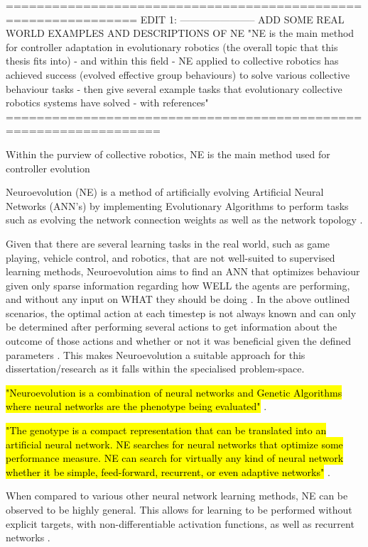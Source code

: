 ===============================================================
EDIT 1:
-----------------------
ADD SOME REAL WORLD EXAMPLES AND DESCRIPTIONS OF NE 
"NE is the main method for controller adaptation in evolutionary robotics (the overall topic that this thesis fits into) - and within this field - NE applied to collective robotics has achieved success (evolved effective group behaviours) to solve various collective behaviour tasks - then give several example tasks that evolutionary collective robotics systems have solved - with references"
==================================================================

Within the purview of collective robotics, NE is the main method used for controller evolution

Neuroevolution (NE) is a method of artificially evolving Artificial Neural Networks (ANN's) by implementing Evolutionary Algorithms to perform tasks such as evolving the network connection weights as well as the network topology \cite{Stanley2004, XinYao1999}.

Given that there are several learning tasks in the real world, such as game playing, vehicle control, and robotics, that are not well-suited to supervised learning methods, Neuroevolution aims to find an ANN that optimizes behaviour given only sparse information regarding how WELL the agents are performing, and without any input on WHAT they should be doing \cite{Miikkulainen2010}. 
In the above outlined scenarios, the optimal action at each timestep is not always known and can only be determined after performing several actions to get information about the outcome of those actions and whether or not it was beneficial given the defined parameters \cite{Miikkulainen2010}.
This makes Neuroevolution a suitable approach for this dissertation/research as it falls within the specialised problem-space.

\hl{"Neuroevolution is a combination of neural networks and Genetic Algorithms where neural networks are the phenotype being evaluated"} \cite{Stanley2004}.

\hl{"The genotype is a compact representation that can be translated into an artificial neural network. NE searches for neural networks that optimize some performance measure. NE can search for virtually any kind of neural network whether it be simple, feed-forward, recurrent, or even adaptive networks"} \cite{Stanley2004}.

When compared to various other neural network learning methods, NE can be observed to be highly general. This allows for learning to be performed without explicit targets, with non-differentiable activation functions, as well as recurrent networks \cite{Miikkulainen2010}.

